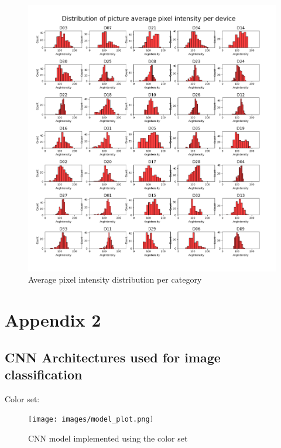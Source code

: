 \documentclass[
  11pt,
]{article}
\begin{document}
\begin{figure}
\centering
\includegraphics[width=\textwidth,height=0.75\textheight]{images/pixel_intensity_distribution.png}
\caption{Average pixel intensity distribution per category}
\end{figure}

\pagebreak

\hypertarget{appendix-2}{%
\section{Appendix 2}\label{appendix-2}}

\hypertarget{cnn-architectures-used-for-image-classification}{%
\subsection{CNN Architectures used for image
classification}\label{cnn-architectures-used-for-image-classification}}

Color set:

\begin{figure}
\centering
\texttt{[image: images/model\_plot.png]}
\caption{CNN model implemented using the color set}
\end{figure}
\end{document}

